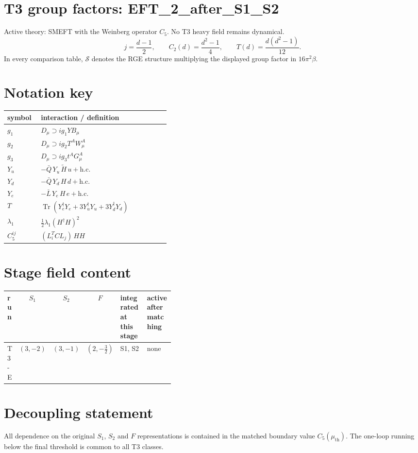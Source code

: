 \documentclass[9pt]{article}
\begin{document}
\section*{T3 group factors: EFT\_2\_after\_S1\_S2}
Active theory: SMEFT with the Weinberg operator $C_5$.  No T3 heavy field remains dynamical.
\[j=\frac{d-1}{2},\qquad C_2(d)=\frac{d^2-1}{4},\qquad T(d)=\frac{d(d^2-1)}{12}.\]
In every comparison table, $\mathcal{S}$ denotes the RGE structure multiplying the displayed group factor in $16\pi^2\beta$.
\section*{Notation key}
\begin{longtable}{@{}p{0.19\linewidth}p{0.73\linewidth}@{}}
\toprule
symbol & interaction / definition \\
\midrule
$g_1$ & $D_\mu\supset i g_1 Y B_\mu$ \\
$g_2$ & $D_\mu\supset i g_2 T^A W_\mu^A$ \\
$g_3$ & $D_\mu\supset i g_3 t^A G_\mu^A$ \\
$Y_u$ & $-\bar Q\,Y_u\,\widetilde H\,u+\mathrm{h.c.}$ \\
$Y_d$ & $-\bar Q\,Y_d\,H\,d+\mathrm{h.c.}$ \\
$Y_e$ & $-\bar L\,Y_e\,H\,e+\mathrm{h.c.}$ \\
$T$ & $\operatorname{Tr}\!\left(Y_e^\dagger Y_e+3Y_u^\dagger Y_u+3Y_d^\dagger Y_d\right)$ \\
$\lambda_1$ & $\frac12\lambda_1(H^\dagger H)^2$ \\
$C_5^{ij}$ & $(L_i^T C L_j)\,H H$ \\
\bottomrule
\end{longtable}
\section*{Stage field content}
\begin{longtable}{@{}lccc p{0.20\linewidth}p{0.20\linewidth}@{}}
\toprule
run & $S_1$ & $S_2$ & $F$ & integrated at this stage & active after matching \\
\midrule
T3-E & $(3,-2)$ & $(3,-1)$ & $(2,- \frac{3}{2})$ & S1, S2 & none \\
\bottomrule
\end{longtable}
\section*{Decoupling statement}
All dependence on the original $S_1$, $S_2$ and $F$ representations is contained in the matched boundary value $C_5(\mu_{\mathrm{th}})$.  The one-loop running below the final threshold is common to all T3 classes.
\end{document}
